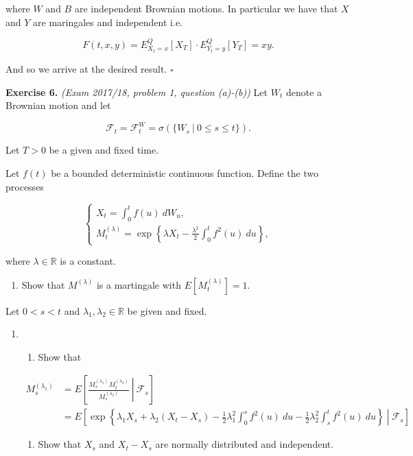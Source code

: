 \documentclass[
]{article}
\providecommand{\tightlist}{%
  \setlength{\itemsep}{0pt}\setlength{\parskip}{0pt}}
\begin{document}
where \(W\) and \(B\) are independent Brownian motions. In particular we
have that \(X\) and \(Y\) are maringales and independent i.e.

\[
F(t,x,y)=E^Q_{X_t=x}[X_T]\cdot E^Q_{Y_t=y}[Y_T]=xy.
\]

And so we arrive at the desired result. \(\square\)

\textbf{Exercise 6.} \emph{(Exam 2017/18, problem 1, question (a)-(b))}
Let \(W_t\) denote a Brownian motion and let

\[
\mathcal{F}_t=\mathcal{F}_t^W=\sigma(\{W_s\ \vert\ 0\le s\le t\}).
\]

Let \(T>0\) be a given and fixed time.

Let \(f(t)\) be a bounded deterministic continuous function. Define the
two processes

\[
\begin{cases}
X_t=\int_0^tf(u)\ dW_u,\\
M^{(\lambda)}_t=\exp\left\{\lambda X_t-\frac{\lambda^2}{2}\int_0^t f^2(u)\ du\right\},
\end{cases}
\]

where \(\lambda\in\mathbb{R}\) is a constant.

\begin{enumerate}
\def\labelenumi{\alph{enumi}.}
\tightlist
\item
  Show that \(M^{(\lambda)}\) is a martingale with
  \(E[M_t^{(\lambda)}]=1\).
\end{enumerate}

Let \(0<s<t\) and \(\lambda_1,\lambda_2\in \mathbb{R}\) be given and
fixed.

\begin{enumerate}
\def\labelenumi{\alph{enumi}.}
\setcounter{enumi}{1}
\item
  \begin{enumerate}
  \def\labelenumii{\roman{enumii}.}
  \tightlist
  \item
    Show that
  \end{enumerate}

  \begin{align*}
  M^{(\lambda_1)}_s&=E\left[\left.\frac{M^{(\lambda_1)}_sM^{(\lambda_2)}_t}{M^{(\lambda_2)}_s} \ \right\vert\ \mathcal{F}_s\right]\\
  &=E\left[\left.\exp\left\{\lambda_1X_s+\lambda_2(X_t-X_s)-\frac{1}{2}\lambda_1^2\int_0^sf^2(u)\ du- \frac{1}{2}\lambda_2^2\int_s^tf^2(u)\ du\right\} \ \right\vert\ \mathcal{F}_s\right]
  \end{align*}

  \begin{enumerate}
  \def\labelenumii{\roman{enumii}.}
  \setcounter{enumii}{1}
  \tightlist
  \item
    Show that \(X_s\) and \(X_t-X_s\) are normally distributed and
    independent.
  \end{enumerate}
\end{enumerate}
\end{document}
